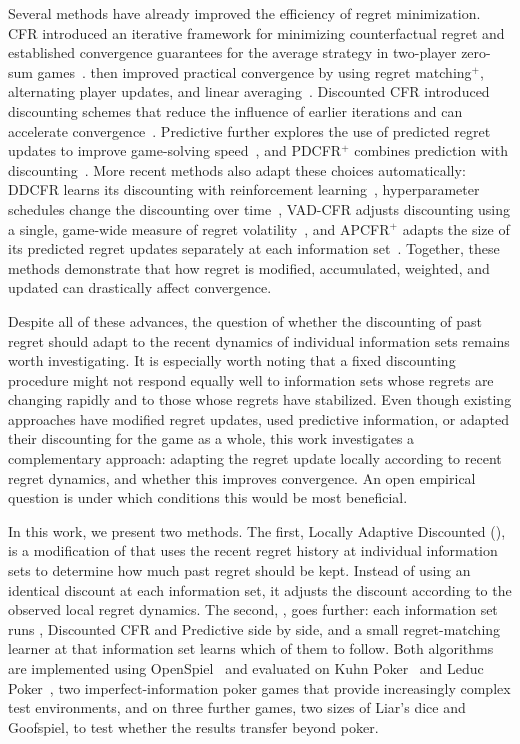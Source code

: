 Several methods have already improved the efficiency of regret minimization. CFR introduced an
iterative framework for minimizing counterfactual regret and established convergence guarantees
for the average strategy in two-player zero-sum games~\cite{zinkevich2007regret}. \cfrp{} then
improved practical convergence by using regret matching$^+$, alternating player updates, and
linear averaging~\cite{tammelin2015solving}. Discounted CFR introduced discounting schemes that
reduce the influence of earlier iterations and can accelerate convergence~\cite{brown2019solving}.
Predictive \cfrp{} further explores the use of predicted regret updates to improve game-solving
speed~\cite{farina2021faster}, and PDCFR$^+$ combines prediction with
discounting~\cite{xu2024minimizing}. More recent methods also adapt these choices automatically:
DDCFR learns its discounting with reinforcement learning~\cite{xu2024dynamic}, hyperparameter
schedules change the discounting over time~\cite{zhang2026faster}, VAD-CFR adjusts discounting
using a single, game-wide measure of regret volatility~\cite{li2026discovering}, and APCFR$^+$
adapts the size of its predicted regret updates separately at each information
set~\cite{meng2025faster}. Together, these methods demonstrate that how regret is modified,
accumulated, weighted, and updated can drastically affect convergence.

Despite all of these advances, the question of whether the discounting of past regret should
adapt to the recent dynamics of individual information sets remains worth investigating. It is
especially worth noting that a fixed discounting procedure might not respond equally well to
information sets whose regrets are changing rapidly and to those whose regrets have stabilized.
Even though existing approaches have modified regret updates, used predictive information, or
adapted their discounting for the game as a whole, this work investigates a complementary
approach: adapting the regret update locally according to recent regret dynamics, and whether
this improves convergence. An open empirical question is under which conditions
this would be most beneficial.

In this work, we present two methods. The first, Locally Adaptive Discounted \cfrp{} (\ours{}),
is a modification of \cfrp{} that uses the recent regret history at individual information
sets to determine how much past regret should be kept. Instead of using an identical discount
at each information set, it adjusts the discount according to the observed local regret
dynamics. The second, \mix{}, goes further: each information set runs \cfrp{}, Discounted CFR
and Predictive \cfrp{} side by side, and a small regret-matching learner at that information
set learns which of them to follow. Both algorithms are implemented using
OpenSpiel~\cite{lanctot2019openspiel} and evaluated on Kuhn Poker~\cite{kuhn1950simplified} and
Leduc Poker~\cite{southey2005bayes}, two imperfect-information poker games that provide
increasingly complex test environments, and on three further games, two sizes of Liar's dice
and Goofspiel, to test whether the results transfer beyond poker.

